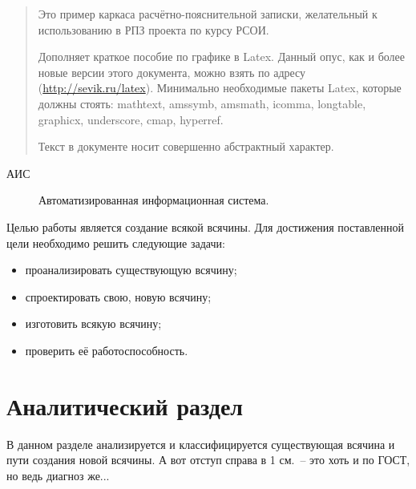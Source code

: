 \documentclass[utf8]{G7-32} %
\begin{document}
 
\frontmatter %

\begin{abstract}
Это пример каркаса расчётно-пояснительной записки, желательный к использованию в РПЗ проекта по курсу РСОИ.

Дополняет краткое пособие по графике в Latex.  Данный опус, как и более новые версии этого документа, можно взять по адресу (\url{http://sevik.ru/latex}). Минимально необходимые пакеты Latex, которые должны стоять: mathtext, amssymb, amsmath, icomma, longtable, graphicx, underscore, cmap, hyperref.

Текст в документе носит совершенно абстрактный характер.
\end{abstract}

\tableofcontents


\Abbreviations %
\begin{description}
\item[АИС] Автоматизированная информационная система.
\end{description}

\Introduction

Целью работы является создание всякой всячины. Для достижения поставленной цели необходимо решить следующие задачи:
%
\begin{itemize}
\item проанализировать существующую всячину;
\item спроектировать свою, новую всячину;
\item изготовить всякую всячину;
\item проверить её работоспособность.
\end{itemize}

\mainmatter %

\chapter{Аналитический раздел}
%
%
В данном разделе анализируется и классифицируется существующая всячина и пути создания новой всячины. А вот отступ справа в 1 см.~-- это хоть и по ГОСТ, но ведь диагноз же...
\end{document}
